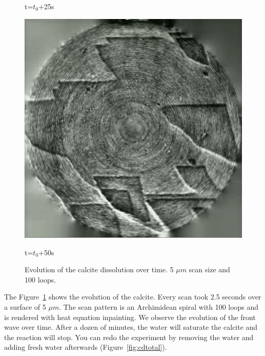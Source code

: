 \begin{figure}[!ht]
    \caption*{t=$t_0$+25s} 
\endminipage\hfill
{}%
    \includegraphics[width=\linewidth]{images/calcite3.png}
    \caption*{t=$t_0$+50s} 
\endminipage
\caption{Evolution of the calcite dissolution over time. 5 $\mu m$ scan size and 100 loops.} \label{fig:cdtotal1}

\end{figure}
The Figure~\ref{fig:cdtotal1} shows the evolution of the calcite. Every scan took 2.5 seconds over a surface of 5 $\mu m$. The scan pattern is an Archimidean spiral with 100 loops and is rendered with heat equation inpainting. We observe the evolution of the front wave over time. After a dozen of minutes, the water will saturate the calcite and the reaction will stop. You can redo the experiment by removing the water and adding fresh water afterwards (Figure~\ref{fig:cdtotal}).


